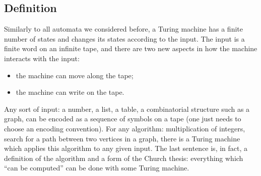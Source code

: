 \subsection{Definition}
Similarly to all automata we considered before,
a Turing machine has a finite number of states and changes its states according to the input.
The input is a finite word on an infinite tape, and there are two new aspects in how the machine interacts with the input:
\begin{itemize}
\item
the machine can move along the tape;
\item
the machine can write on the tape.
\end{itemize}

Any sort of input: a number, a list, a table, a combinatorial structure such as a graph,
can be encoded as a sequence of symbols on a tape (one just needs to choose an encoding convention).
For any algorithm: multiplication of integers, search for a path between two vertices in a graph,
there is a Turing machine which applies this algorithm to any given input.
The last sentence is, in fact, a definition of the algorithm and a form of the Church thesis:
everything which ``can be computed'' can be done with some Turing machine.

